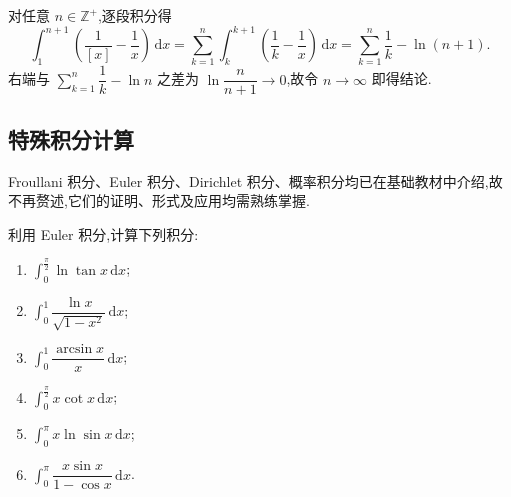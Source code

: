 \begin{solution}
  对任意 $n\in\mathbb{Z}^+$,逐段积分得
  \[
    \int_1^{n+1}\left(\dfrac{1}{[x]}-\dfrac{1}{x}\right)\,\mathrm{d}x
    =\sum\limits_{k=1}^{n}\int_k^{k+1}\left(\dfrac{1}{k}-\dfrac{1}{x}\right)\,\mathrm{d}x
    =\sum\limits_{k=1}^{n}\dfrac{1}{k}-\ln(n+1).
  \]
  右端与 $\displaystyle\sum\limits_{k=1}^{n}\dfrac{1}{k}-\ln n$ 之差为
  $\ln\dfrac{n}{n+1}\to0$,故令 $n\to\infty$ 即得结论.
\end{solution}



\subsection{特殊积分计算}

Froullani 积分、Euler 积分、Dirichlet 积分、概率积分均已在基础教材中介绍,故不再赘述,它们的证明、形式及应用均需熟练掌握.

\begin{example}
  利用 Euler 积分,计算下列积分:
  \begin{enumerate}
    \item $\displaystyle\int_0^{\frac{\pi}{2}}\ln\tan x\,\mathrm{d}x$;
    \item $\displaystyle\int_0^1\dfrac{\ln x}{\sqrt{1-x^2}}\,\mathrm{d}x$;
    \item $\displaystyle\int_0^1\dfrac{\arcsin x}{x}\,\mathrm{d}x$;
    \item $\displaystyle\int_0^{\frac{\pi}{2}}x\cot x\,\mathrm{d}x$;
    \item $\displaystyle\int_0^\pi x\ln\sin x\,\mathrm{d}x$;
    \item $\displaystyle\int_0^\pi\dfrac{x\sin x}{1-\cos x}\,\mathrm{d}x$.
  \end{enumerate}
\end{example}
\exampleblank

